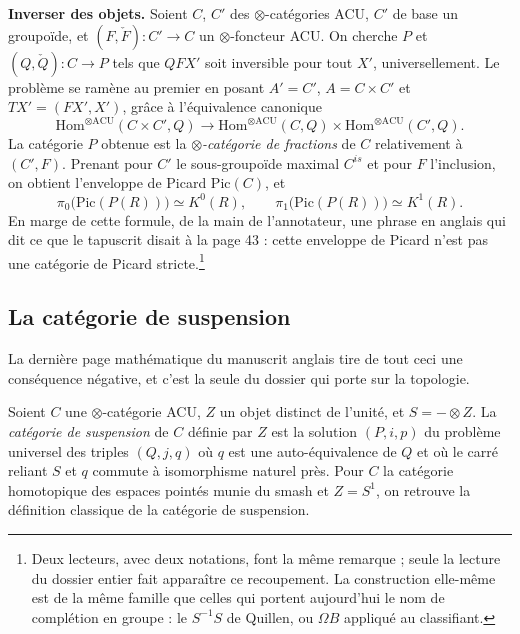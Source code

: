 \documentclass[11pt,a4paper]{article}
\begin{document}
\textbf{Inverser des objets.} Soient $C$, $C'$ des $\otimes$-catégories ACU,
$C'$ de base un groupoïde, et $(F,\check{F}) : C' \to C$ un
$\otimes$-foncteur ACU. On cherche $P$ et $(Q,\check{Q}) : C \to P$ tels que
$QFX'$ soit inversible pour tout $X'$, universellement. Le problème se ramène
au premier en posant $A' = C'$, $A = C \times C'$ et $TX' = (FX', X')$,
grâce à l'équivalence canonique
\[
\mathrm{Hom}^{\otimes \mathrm{ACU}}(C \times C', Q) \longrightarrow
\mathrm{Hom}^{\otimes \mathrm{ACU}}(C, Q) \times
\mathrm{Hom}^{\otimes \mathrm{ACU}}(C', Q).
\]
La catégorie $P$ obtenue est la \emph{$\otimes$-catégorie de fractions} de
$C$ relativement à $(C', F)$. Prenant pour $C'$ le sous-groupoïde maximal
$C^{is}$ et pour $F$ l'inclusion, on obtient l'enveloppe de Picard
$\mathrm{Pic}(C)$, et
\[
\pi_{0}\bigl(\mathrm{Pic}(P(R))\bigr) \simeq K^{0}(R), \qquad
\pi_{1}\bigl(\mathrm{Pic}(P(R))\bigr) \simeq K^{1}(R).
\]
En marge de cette formule, de la main de l'annotateur, une phrase en anglais
qui dit ce que le tapuscrit disait à la page 43 : cette enveloppe
de Picard n'est pas une catégorie de Picard stricte.\footnote{Deux lecteurs, avec deux
notations, font la même remarque ; seule la lecture du dossier entier fait
apparaître ce recoupement. La construction elle-même est de
la même famille que celles qui portent aujourd'hui le nom de complétion en
groupe : le $S^{-1}S$ de Quillen, ou $\Omega B$ appliqué au classifiant.}

\subsection*{La catégorie de suspension}

La dernière page mathématique du manuscrit anglais tire de tout ceci une
conséquence négative, et c'est la seule du dossier qui porte sur la topologie.

Soient $C$ une $\otimes$-catégorie ACU, $Z$ un objet distinct de l'unité, et
$S = -\otimes Z$. La \emph{catégorie de suspension} de $C$ définie par $Z$ est
la solution $(P, i, p)$ du problème universel des triples $(Q, j, q)$ où $q$
est une auto-équivalence de $Q$ et où le carré reliant $S$ et $q$ commute à
isomorphisme naturel près. Pour $C$ la catégorie homotopique des espaces
pointés munie du smash et $Z = S^{1}$, on retrouve la définition classique de
la catégorie de suspension.
\end{document}
